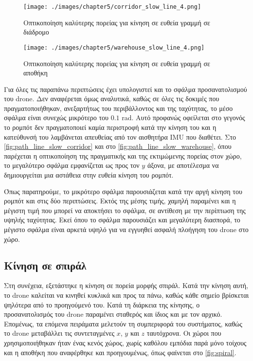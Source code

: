 \begin{figure}[!ht]
    \centering
    \texttt{[image: ./images/chapter5/corridor\_slow\_line\_4.png]}
    \caption{Οπτικοποίηση καλύτερης πορείας για κίνηση σε ευθεία γραμμή σε διάδρομο}
    \label{fig:path_line_slow_corridor}
\end{figure}

\begin{figure}[!ht]
    \centering
    \texttt{[image: ./images/chapter5/warehouse\_slow\_line\_4.png]}
    \caption{Οπτικοποίηση καλύτερης πορείας για κίνηση σε ευθεία γραμμή σε αποθήκη}
    \label{fig:path_line_slow_warehouse}
\end{figure}

Για όλες τις παραπάνω περιπτώσεις έχει υπολογιστεί και το σφάλμα προσανατολισμού του drone. Δεν αναφέρεται όμως αναλυτικά, καθώς σε όλες τις δοκιμές που πραγματοποιήθηκαν, ανεξαρτήτως του περιβάλλοντος και της ταχύτητας, το μέσο σφάλμα είναι συνεχώς μικρότερο του $0.1$ rad. Αυτό προφανώς οφείλεται στο γεγονός το ρομπότ δεν πραγματοποιεί καμία περιστροφή κατά την κίνηση του και η κατεύθυνσή του λαμβάνεται απευθείας από τον αισθητήρα IMU που διαθέτει. Στο \autoref{fig:path_line_slow_corridor} και στο \autoref{fig:path_line_slow_warehouse}, όπου παρέχεται η οπτικοποίηση της πραγματικής και της εκτιμώμενης πορείας στον χώρο, το μεγαλύτερο σφάλμα εμφανίζεται ως προς τον $y$ άξονα, με αποτέλεσμα να δημιουργείται μια αστάθεια στην ευθεία κίνηση του ρομπότ.

Όπως παρατηρούμε, το μικρότερο σφάλμα παρουσιάζεται κατά την αργή κίνηση του ρομπότ και στις δύο περιπτώσεις. Εκτός της μέσης τιμής, χαμηλή παραμένει και η μέγιστη τιμή που μπορεί να αποκτήσει το σφάλμα, σε αντίθεση με την περίπτωση της υψηλής ταχύτητας. Εκεί όπου το σφάλμα παρουσιάζει και μεγαλύτερη διασπορά, το μέγιστο σφάλμα είναι αρκετά υψηλό για να εγγυηθεί ασφαλή πλοήγηση του drone στο χώρο.

\clearpage

\subsection{Κίνηση σε σπιράλ}
\label{subsection:localization_tests_spiral}

Στη συνέχεια, εξετάστηκε η κίνηση σε πορεία μορφής σπιράλ. Κατά την κίνηση αυτή, το drone καλείται να κινηθεί κυκλικά και προς τα πάνω, καθώς κάθε σημείο βρίσκεται ψηλότερα από το προηγούμενό του. Κατά τη διάρκεια της κίνησης, ο προσανατολισμός του drone παραμένει σταθερός και ίδιος και με τον αρχικό. Επομένως, τα επόμενα πειράματα μελετούν τη συμπεριφορά του συστήματος, καθώς το drone μεταβάλλει τις συντεταγμένες $x$, $y$ και $z$ ταυτόχρονα. Οι χώροι που χρησιμοποιήθηκαν ήταν ένας κενός χώρος, χωρίς καθόλου εμπόδια παρά μόνο τοίχους και η αποθήκη που αναφέρθηκε και προηγουμένως, όπως φαίνεται στο \autoref{fig:spiral}.

